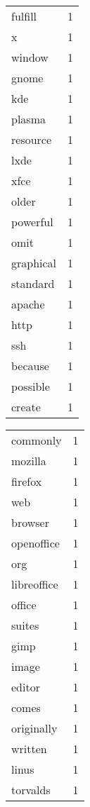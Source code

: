 \begin{center}
\begin{scriptsize}
\begin{tabular}{|ll|}
fulfill        & 1\\%
x              & 1\\%
window         & 1\\%
gnome          & 1\\%
kde            & 1\\%
plasma         & 1\\%
resource       & 1\\%
lxde           & 1\\%
xfce           & 1\\%
older          & 1\\%
powerful       & 1\\%
omit           & 1\\%
graphical      & 1\\%
standard       & 1\\%
apache         & 1\\%
http           & 1\\%
ssh            & 1\\%
because        & 1\\%
possible       & 1\\%
create         & 1\\%
\hline
\end{tabular}
\begin{tabular}{|ll|}
\hline
commonly       & 1\\%
mozilla        & 1\\%
firefox        & 1\\%
web            & 1\\%
browser        & 1\\%
openoffice     & 1\\%
org            & 1\\%
libreoffice    & 1\\%
office         & 1\\%
suites         & 1\\%
gimp           & 1\\%
image          & 1\\%
editor         & 1\\%
comes          & 1\\%
originally     & 1\\%
written        & 1\\%
linus          & 1\\%
torvalds       & 1\\%

\end{tabular}
\end{scriptsize}
\end{center}
